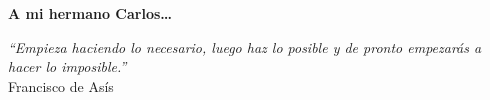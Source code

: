\thispagestyle{empty}

\begin{flushright}

  \vspace*{\fill}

  \textbf{A mi hermano Carlos\ldots}\\

  \vspace{3cm}

  \emph{``Empieza haciendo lo necesario, luego haz lo posible y de
    pronto empezarás a hacer lo imposible.''}\\ Francisco de Asís

\end{flushright}  

\vspace{4cm}
\vspace*{\fill}